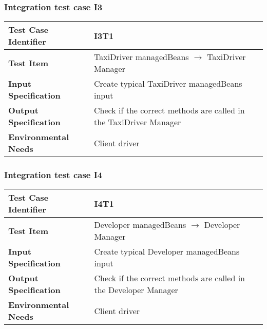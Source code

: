\subsubsection{Integration test case I3}

\begin{table}[!htbp]
\begin{center}
\begin{tabular}[t]{p{}p{}}

\hline
\textbf{Test Case Identifier} & I3T1 \\
\hline
\textbf{Test Item} & TaxiDriver managedBeans $\rightarrow$ TaxiDriver Manager \\
\hline
\textbf{Input Specification} & Create typical TaxiDriver managedBeans input  \\
\hline
\textbf{Output Specification} & Check if the correct methods are called in the TaxiDriver Manager \\
\hline
\textbf{Environmental Needs} & Client driver \\
\hline

\end{tabular}
\end{center}
\end{table}
\clearpage


\subsubsection{Integration test case I4}

\begin{table}[!htbp]
\begin{center}
\begin{tabular}[t]{p{}p{}}

\hline
\textbf{Test Case Identifier} & I4T1 \\
\hline
\textbf{Test Item} & Developer managedBeans $\rightarrow$ Developer Manager \\
\hline
\textbf{Input Specification} & Create typical Developer managedBeans input  \\
\hline
\textbf{Output Specification} & Check if the correct methods are called in the Developer Manager \\
\hline
\textbf{Environmental Needs} & Client driver \\
\hline

\end{tabular}
\end{center}
\end{table}
\clearpage


